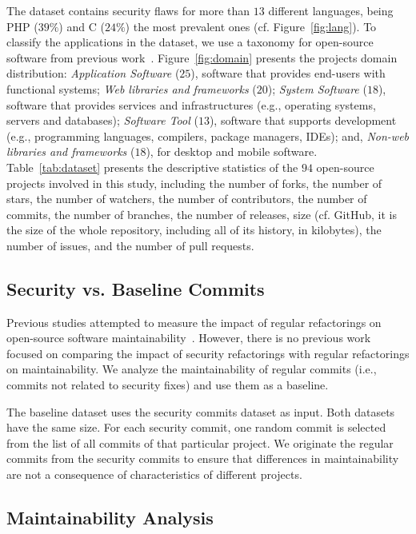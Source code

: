 \documentclass[sigconf,review]{acmart}
\begin{document}
The dataset contains security flaws for more than $13$ different languages,
being PHP ($39\%$) and C ($24\%$) the most prevalent ones (cf. Figure~\ref{fig:lang}).
To classify the applications in the dataset, we use a taxonomy for open-source
software from previous work~\cite{7816479}. Figure~\ref{fig:domain}
presents the projects domain distribution: \textit{Application Software} ($25$),
software that provides end-users with functional systems; \textit{Web libraries
and frameworks} ($20$); \textit{System Software} ($18$), software that provides
services and infrastructures (e.g., operating systems, servers and databases);
\textit{Software Tool} ($13$), software that supports development (e.g.,
programming languages, compilers, package managers, IDEs); and, \textit{Non-web
libraries and frameworks} ($18$), for desktop and mobile software.
%
Table~\ref{tab:dataset} presents the descriptive statistics of the $94$
open-source projects involved in this study, including the number of forks, the
number of stars, the number of watchers, the number of contributors, the number
of commits, the number of branches, the number of releases, size (cf. GitHub, it
is the size of the whole repository, including all of its history, in
kilobytes), the number of issues, and the number of pull requests.


%
\subsection{Security vs. Baseline Commits}
%
Previous studies attempted to measure the impact of regular refactorings on
open-source software maintainability~\cite{HEGEDUS2018313}. However, there is no
previous work focused on comparing the impact of security refactorings with
regular refactorings on maintainability.
We analyze the maintainability of regular commits (i.e., commits not related
to security fixes) and use them as a baseline.

The baseline dataset uses the security commits dataset as input.
Both datasets have the same size. For each
security commit, one random commit is selected from the list of all commits of
that particular project. We originate the regular commits from the security
commits to ensure that differences in maintainability are not a consequence of
characteristics of different projects.
%
\subsection{Maintainability Analysis}
\end{document}
